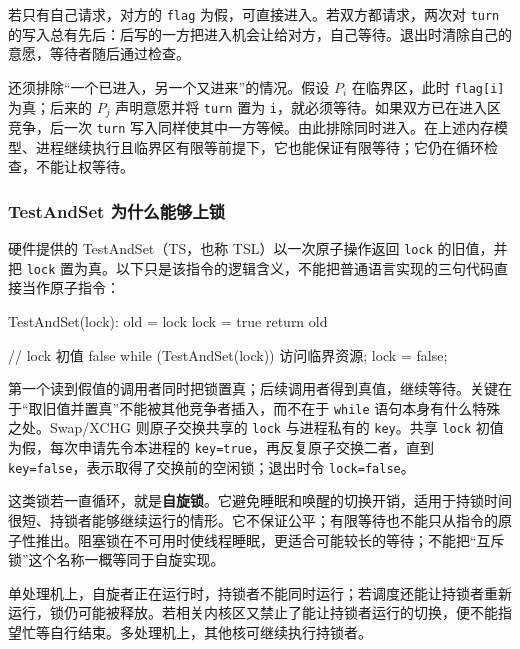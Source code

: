 若只有自己请求，对方的 \texttt{flag} 为假，可直接进入。若双方都请求，两次对 \texttt{turn} 的写入总有先后：后写的一方把进入机会让给对方，自己等待。退出时清除自己的意愿，等待者随后通过检查。

还须排除``一个已进入，另一个又进来''的情况。假设 \(P_i\) 在临界区，此时 \texttt{flag[\allowbreak{}i]\allowbreak{}} 为真；后来的 \(P_j\) 声明意愿并将 \texttt{turn} 置为 \texttt{i}，就必须等待。如果双方已在进入区竞争，后一次 \texttt{turn} 写入同样使其中一方等候。由此排除同时进入。在上述内存模型、进程继续执行且临界区有限等前提下，它也能保证有限等待；它仍在循环检查，不能让权等待。

\subsubsection{TestAndSet 为什么能够上锁}\label{OS02-auto-11}

硬件提供的 TestAndSet（TS，也称 TSL）以一次原子操作返回 \texttt{lock} 的旧值，并把 \texttt{lock} 置为真。以下只是该指令的逻辑含义，不能把普通语言实现的三句代码直接当作原子指令：

\par\medskip\noindent\begin{minipage}{\linewidth}
\begin{codeblock}[language={}]
TestAndSet(lock):
    old = lock
    lock = true
    return old

// lock 初值 false
while (TestAndSet(lock)) { }
访问临界资源;
lock = false;
\end{codeblock}
\end{minipage}\par\medskip

第一个读到假值的调用者同时把锁置真；后续调用者得到真值，继续等待。关键在于``取旧值并置真''不能被其他竞争者插入，而不在于 \texttt{while} 语句本身有什么特殊之处。Swap/XCHG 则原子交换共享的 \texttt{lock} 与进程私有的 \texttt{key}。共享 \texttt{lock} 初值为假，每次申请先令本进程的 \texttt{key=\allowbreak{}true}，再反复原子交换二者，直到 \texttt{key=\allowbreak{}false}，表示取得了交换前的空闲锁；退出时令 \texttt{lock=\allowbreak{}false}。

这类锁若一直循环，就是\textbf{自旋锁}。它避免睡眠和唤醒的切换开销，适用于持锁时间很短、持锁者能够继续运行的情形。它不保证公平；有限等待也不能只从指令的原子性推出。阻塞锁在不可用时使线程睡眠，更适合可能较长的等待；不能把``互斥锁''这个名称一概等同于自旋实现。

单处理机上，自旋者正在运行时，持锁者不能同时运行；若调度还能让持锁者重新运行，锁仍可能被释放。若相关内核区又禁止了能让持锁者运行的切换，便不能指望忙等自行结束。多处理机上，其他核可继续执行持锁者。

